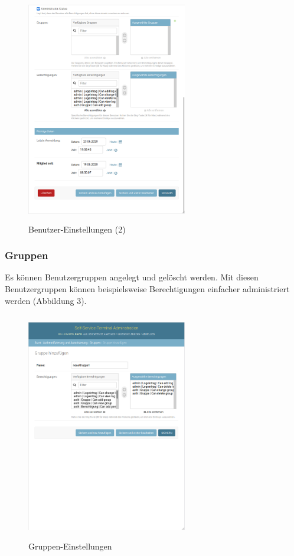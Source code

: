 \begin{figure}[htp]
    \centering
    \includegraphics[width=7cm , height=10cm]{Bilder/AdminBenutzer2.png}
    \caption[Startseite des Self-Service-Terminals]{Benutzer-Einstellungen (2)}
    \label{fig:SSTBenutzer2}
\end{figure}

\newpage

\subsubsection{Gruppen} Es können Benutzergruppen angelegt und gelöscht werden. Mit diesen Benutzergruppen können beispielsweise Berechtigungen einfacher administriert werden (Abbildung 3).

\begin{figure}[htp]
    \centering
    \includegraphics[width=7cm , height=10cm]{Bilder/AdminGruppe.png}
    \caption[Startseite des Self-Service-Terminals]{Gruppen-Einstellungen}
    \label{fig:SSTGruppe}
\end{figure}

